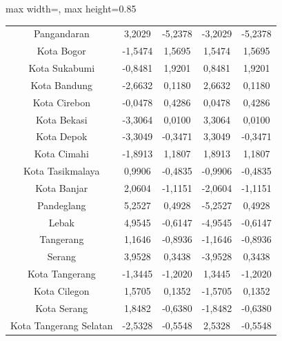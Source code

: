 \begin{table}[H]
\begin{adjustbox}{max width=\textwidth, max height=0.85\textheight}
\begin{tabular}{|c|c|c|c|c|}
Pangandaran & 3,2029 & -5,2378 & -3,2029 & -5,2378 \\
Kota Bogor & -1,5474 & 1,5695 & 1,5474 & 1,5695 \\
Kota Sukabumi & -0,8481 & 1,9201 & 0,8481 & 1,9201 \\
Kota Bandung & -2,6632 & 0,1180 & 2,6632 & 0,1180 \\
Kota Cirebon & -0,0478 & 0,4286 & 0,0478 & 0,4286 \\
Kota Bekasi & -3,3064 & 0,0100 & 3,3064 & 0,0100 \\
Kota Depok & -3,3049 & -0,3471 & 3,3049 & -0,3471 \\
Kota Cimahi & -1,8913 & 1,1807 & 1,8913 & 1,1807 \\
Kota Tasikmalaya & 0,9906 & -0,4835 & -0,9906 & -0,4835 \\
Kota Banjar & 2,0604 & -1,1151 & -2,0604 & -1,1151 \\
Pandeglang & 5,2527 & 0,4928 & -5,2527 & 0,4928 \\
Lebak & 4,9545 & -0,6147 & -4,9545 & -0,6147 \\
Tangerang & 1,1646 & -0,8936 & -1,1646 & -0,8936 \\
Serang & 3,9528 & 0,3438 & -3,9528 & 0,3438 \\
Kota Tangerang & -1,3445 & -1,2020 & 1,3445 & -1,2020 \\
Kota Cilegon & 1,5705 & 0,1352 & -1,5705 & 0,1352 \\
Kota Serang & 1,8482 & -0,6380 & -1,8482 & -0,6380 \\
Kota Tangerang Selatan & -2,5328 & -0,5548 & 2,5328 & -0,5548 \\
\hline
\end{tabular}
\end{adjustbox}
\end{table}